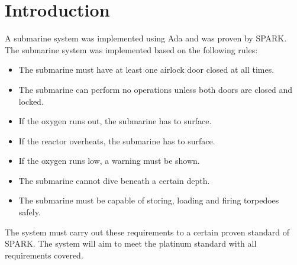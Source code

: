 \section{Introduction}\label{submarine}
A submarine system was implemented using Ada and was proven by SPARK. The submarine system was implemented based on the following rules: 

\begin{itemize}
	\item The submarine must have at least one airlock door closed at all times.
	\item The submarine can perform no operations unless both doors are closed and
	locked.
	\item If the oxygen runs out, the submarine has to surface.
	\item If the reactor overheats, the submarine has to surface.
	\item If the oxygen runs low, a warning must be shown.
	\item The submarine cannot dive beneath a certain depth.
	\item The submarine must be capable of storing, loading and firing torpedoes
	safely.
\end{itemize}

The system must carry out these requirements to a certain proven standard of SPARK. The system will aim to meet the platinum standard with all requirements covered. 
